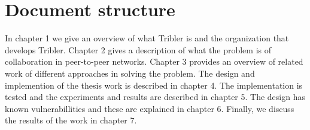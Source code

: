 \section{Document structure}
In chapter 1 we give an overview of what Tribler is and the organization that develops Tribler.
Chapter 2 gives a description of what the problem is of collaboration in peer-to-peer networks.
Chapter 3 provides an overview of related work of different approaches in solving the problem.
The design and implemention of the thesis work is described in chapter 4.
The implementation is tested and the experiments and results are described in chapter 5.
The design has known vulnerabillities and these are explained in chapter 6.
Finally, we discuss the results of the work in chapter 7.

